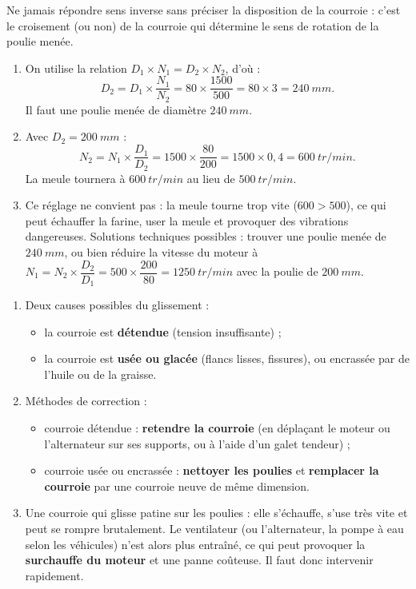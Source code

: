 \documentclass[11pt]{article}
\begin{document}
\begin{attention}
Ne jamais répondre \og sens inverse \fg{} sans préciser la disposition de la courroie : c'est le croisement (ou non) de la courroie qui détermine le sens de rotation de la poulie menée.
\end{attention}

\begin{corrige}
\begin{enumerate}
\item On utilise la relation $D_1 \times N_1 = D_2 \times N_2$, d'où :
\[ D_2 = D_1 \times \frac{N_1}{N_2} = 80 \times \frac{1500}{500} = 80 \times 3 = \SI{240}{mm}. \]
Il faut une poulie menée de diamètre $\SI{240}{mm}$.
\item Avec $D_2 = \SI{200}{mm}$ :
\[ N_2 = N_1 \times \frac{D_1}{D_2} = 1500 \times \frac{80}{200} = 1500 \times 0{,}4 = \SI{600}{tr/min}. \]
La meule tournera à $\SI{600}{tr/min}$ au lieu de $\SI{500}{tr/min}$.
\item Ce réglage ne convient pas : la meule tourne trop vite ($600 > 500$), ce qui peut échauffer la farine, user la meule et provoquer des vibrations dangereuses. Solutions techniques possibles : trouver une poulie menée de $\SI{240}{mm}$, ou bien réduire la vitesse du moteur à $N_1 = N_2 \times \dfrac{D_2}{D_1} = 500 \times \dfrac{200}{80} = \SI{1250}{tr/min}$ avec la poulie de $\SI{200}{mm}$.
\end{enumerate}
\end{corrige}

\begin{corrige}
\begin{enumerate}
\item Deux causes possibles du glissement :
\begin{itemize}
\item la courroie est \textbf{détendue} (tension insuffisante) ;
\item la courroie est \textbf{usée ou glacée} (flancs lisses, fissures), ou encrassée par de l'huile ou de la graisse.
\end{itemize}
\item Méthodes de correction :
\begin{itemize}
\item courroie détendue : \textbf{retendre la courroie} (en déplaçant le moteur ou l'alternateur sur ses supports, ou à l'aide d'un galet tendeur) ;
\item courroie usée ou encrassée : \textbf{nettoyer les poulies} et \textbf{remplacer la courroie} par une courroie neuve de même dimension.
\end{itemize}
\item Une courroie qui glisse patine sur les poulies : elle s'échauffe, s'use très vite et peut se rompre brutalement. Le ventilateur (ou l'alternateur, la pompe à eau selon les véhicules) n'est alors plus entraîné, ce qui peut provoquer la \textbf{surchauffe du moteur} et une panne coûteuse. Il faut donc intervenir rapidement.
\end{enumerate}
\end{corrige}
\end{document}
